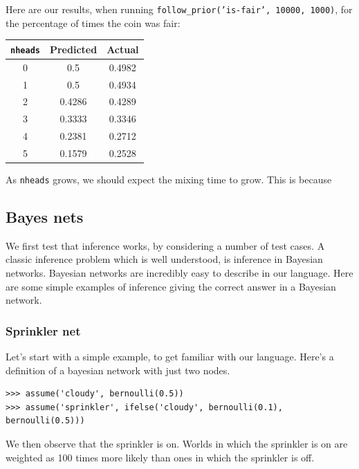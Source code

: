 \documentclass[11pt]{article}
\begin{document}
Here are our results, when running {\tt follow\_prior('is-fair', 10000, 1000)}, for the percentage of times the coin was fair:  

\begin{center}
\begin{tabular}{|c | c| c |} \hline
{\tt nheads} & Predicted & Actual \\ \hline
0 & 0.5 & 0.4982\\ \hline
1 & 0.5 & 0.4934 \\ \hline
2 & 0.4286 &  0.4289 \\ \hline
3 & 0.3333 &  0.3346 \\ \hline
4 & 0.2381 &  0.2712 \\ \hline
5 & 0.1579 &  0.2528 \\ \hline
\end{tabular}
\end{center}

As {\tt nheads} grows, we should expect the mixing time to grow.  This is because 
\subsection{Bayes nets}

We first test that inference works, by considering a number of test cases.  A classic inference problem which is well understood, is inference in Bayesian networks.  Bayesian networks are incredibly easy to describe in our language.  Here are some simple examples of inference giving the correct answer in a Bayesian network.

\subsubsection{Sprinkler net}

Let's start with a simple example, to get familiar with our language.   Here's a definition of a bayesian network with just two nodes.

\begin{small}
\begin{verbatim}
>>> assume('cloudy', bernoulli(0.5))
>>> assume('sprinkler', ifelse('cloudy', bernoulli(0.1), bernoulli(0.5)))
\end{verbatim}
\end{small}

\noindent We then observe that the sprinkler is on.  Worlds in which the sprinkler is on are weighted as 100 times more likely than ones in which the sprinkler is off.  
\end{document}
